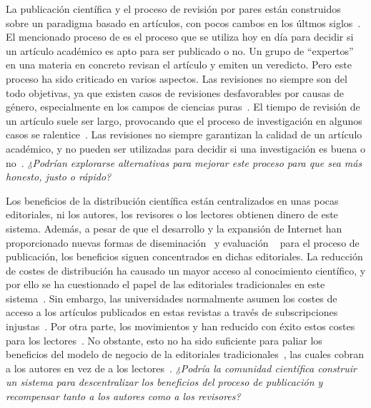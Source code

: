 La publicación científica y el proceso de revisión por pares están construidos
sobre un paradigma basado en artículos, con pocos cambos en los últmos
siglos~\cite{spier2002history}. El mencionado proceso de 
es el proceso que se utiliza hoy en día para decidir si un artículo académico es
apto para ser publicado o no. Un grupo de ``expertos'' en una materia en
concreto revisan el artículo y emiten un veredicto.
Pero este proceso ha sido criticado en varios aspectos. Las revisiones no
siempre son del todo objetivas, ya que existen casos de revisiones desfavorables
por causas de género, especialmente en los campos de ciencias
puras~\cite{wenneras2001nepotism}. El tiempo de revisión de un artículo suele
ser largo, provocando que el proceso de investigación en algunos casos se
ralentice~\cite{huisman2017duration}. Las revisiones no siempre garantizan la
calidad de un artículo académico, y no pueden ser utilizadas para decidir si una
investigación es buena o no~\cite{goldbeck1999evidence}. \emph{¿Podrían
  explorarse alternativas para mejorar este proceso para que sea más honesto,
  justo o rápido?}

Los beneficios de la distribución científica están centralizados en unas pocas
editoriales, ni los autores, los revisores o los lectores obtienen dinero de
este sistema. Además, a pesar de que el desarrollo y la expansión de Internet
han proporcionado nuevas formas de diseminación~\cite{eysenbach2006citation} y
evaluación ~\cite{walker_emerging_2015} para el proceso de publicación, los
beneficios siguen concentrados en dichas editoriales. La reducción de costes de
distribución ha causado un mayor acceso al conocimiento científico, y por ello
se ha cuestionado el papel de las editoriales tradicionales en este
sistema~\cite{ReinventingRigor}. Sin embargo, las universidades normalmente
asumen los costes de acceso a los artículos publicados en estas revistas a
través de subscripciones injustas~\cite{bergstrom2004costs}. Por otra parte, los
movimientos  y  han reducido con éxito estos
costes para los lectores~\cite{evans2009open}. No obstante, esto no ha sido
suficiente para paliar los beneficios del modelo de negocio de la editoriales
tradicionales~\cite{lariviere2015oligopoly}, las cuales cobran a los autores en
vez de a los lectores~\cite{van2013true}. \emph{¿Podría la comunidad científica
  construir un sistema para descentralizar los beneficios del proceso de
  publicación y recompensar tanto a los autores como a los revisores?}

